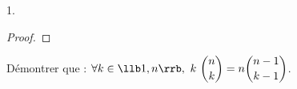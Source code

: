 \begin{noliste}{1.}
\begin{proof}
  \end{proof}




\item Démontrer que : $\forall k \in \llb 1, n\rrb, \ k \
  \dbinom{n}{k} = n \dbinom{n-1}{k-1}$.


\end{noliste}
